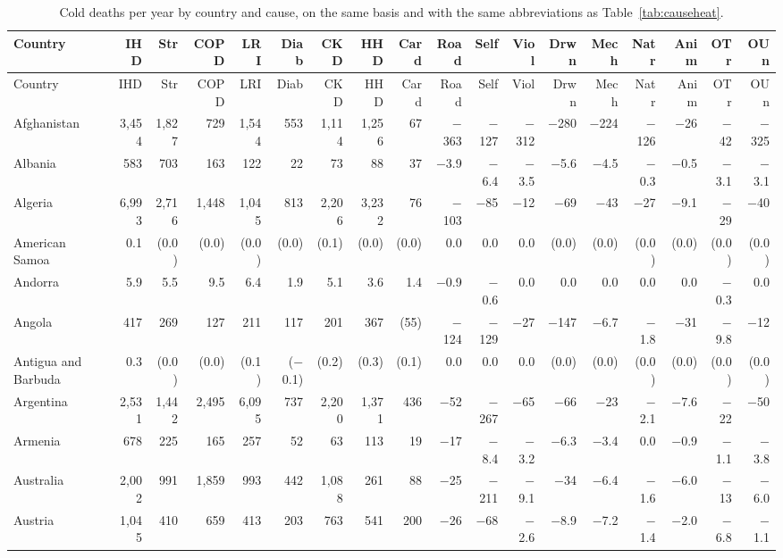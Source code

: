 \begin{longtable}{lrrrrrrrrrrrrrrrrr}
\caption{Cold deaths per year by country and cause, on the same basis and with the same abbreviations as Table~\ref{tab:causeheat}.}\label{tab:causecold}\\
\toprule
Country & IHD & Str & COPD & LRI & Diab & CKD & HHD & Card & Road & Self & Viol & Drwn & Mech & Natr & Anim & OTr & OUn \\
\midrule
\endfirsthead
\toprule
Country & IHD & Str & COPD & LRI & Diab & CKD & HHD & Card & Road & Self & Viol & Drwn & Mech & Natr & Anim & OTr & OUn \\
\midrule
\endhead
\bottomrule
\endfoot
Afghanistan & 3,454 & 1,827 & 729 & 1,544 & 553 & 1,114 & 1,256 & 67 & $-$363 & $-$127 & $-$312 & $-$280 & $-$224 & $-$126 & $-$26 & $-$42 & $-$325 \\
Albania & 583 & 703 & 163 & 122 & 22 & 73 & 88 & 37 & $-$3.9 & $-$6.4 & $-$3.5 & $-$5.6 & $-$4.5 & $-$0.3 & $-$0.5 & $-$3.1 & $-$3.1 \\
Algeria & 6,993 & 2,716 & 1,448 & 1,045 & 813 & 2,206 & 3,232 & 76 & $-$103 & $-$85 & $-$12 & $-$69 & $-$43 & $-$27 & $-$9.1 & $-$29 & $-$40 \\
American Samoa & 0.1 & (0.0) & (0.0) & (0.0) & (0.0) & (0.1) & (0.0) & (0.0) & 0.0 & 0.0 & 0.0 & (0.0) & (0.0) & (0.0) & (0.0) & (0.0) & (0.0) \\
Andorra & 5.9 & 5.5 & 9.5 & 6.4 & 1.9 & 5.1 & 3.6 & 1.4 & $-$0.9 & $-$0.6 & 0.0 & 0.0 & 0.0 & 0.0 & 0.0 & $-$0.3 & 0.0 \\
Angola & 417 & 269 & 127 & 211 & 117 & 201 & 367 & (55) & $-$124 & $-$129 & $-$27 & $-$147 & $-$6.7 & $-$1.8 & $-$31 & $-$9.8 & $-$12 \\
Antigua and Barbuda & 0.3 & (0.0) & (0.0) & (0.1) & ($-$0.1) & (0.2) & (0.3) & (0.1) & 0.0 & 0.0 & 0.0 & (0.0) & (0.0) & (0.0) & (0.0) & (0.0) & (0.0) \\
Argentina & 2,531 & 1,442 & 2,495 & 6,095 & 737 & 2,200 & 1,371 & 436 & $-$52 & $-$267 & $-$65 & $-$66 & $-$23 & $-$2.1 & $-$7.6 & $-$22 & $-$50 \\
Armenia & 678 & 225 & 165 & 257 & 52 & 63 & 113 & 19 & $-$17 & $-$8.4 & $-$3.2 & $-$6.3 & $-$3.4 & 0.0 & $-$0.9 & $-$1.1 & $-$3.8 \\
Australia & 2,002 & 991 & 1,859 & 993 & 442 & 1,088 & 261 & 88 & $-$25 & $-$211 & $-$9.1 & $-$34 & $-$6.4 & $-$1.6 & $-$6.0 & $-$13 & $-$6.0 \\
Austria & 1,045 & 410 & 659 & 413 & 203 & 763 & 541 & 200 & $-$26 & $-$68 & $-$2.6 & $-$8.9 & $-$7.2 & $-$1.4 & $-$2.0 & $-$6.8 & $-$1.1 \\

\end{longtable}
